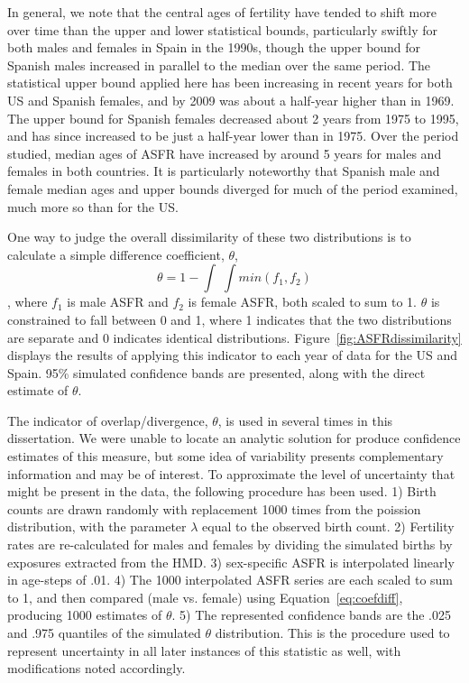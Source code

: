 In general, we note that the central ages of fertility have tended to shift more
over time than the upper and lower statistical bounds, particularly swiftly for
both males and females in Spain in the 1990s, though the upper bound for
Spanish males increased in parallel to the median over the same period. The
statistical upper bound applied here has been increasing in recent years for
both US and Spanish females, and by 2009 was about a half-year higher than in
1969. The upper bound for Spanish females decreased about 2 years from 1975
to 1995, and has since increased to be just a half-year lower than in 1975. Over
the period studied, median ages of ASFR have increased by around 5 years for
males and females in both countries. It is particularly noteworthy that Spanish
male and female median ages and upper bounds diverged for much of the period
examined, much more so than for the US.

One way to judge the overall dissimilarity of these two distributions is to
calculate a simple difference coefficient, $\theta$,
\begin{equation}
\label{eq:coefdiff}
\theta = 1 - \int \;\int min(f_1, f_2)
\end{equation}
, where $f_1$ is male ASFR and $f_2$ is female ASFR, both scaled to sum
to 1. $\theta$ is constrained to fall between 0 and 1, where 1 indicates that the
two distributions are separate and 0 indicates identical distributions.
Figure~\ref{fig:ASFRdissimilarity} displays the results of applying this
indicator to each year of data for the US and Spain. 95\% simulated confidence
bands are presented, along with the direct estimate of
$\theta$. 

The indicator of overlap/divergence, $\theta$, is
used in several times in this dissertation. We were unable to locate
an analytic solution for produce confidence estimates of this measure, but
some idea of variability presents complementary information and may be of
interest. To approximate the level of uncertainty that might be present in the
data, the following procedure has been used. 1) Birth counts are drawn randomly
with replacement 1000 times from the poission distribution, with the parameter
$\lambda$ equal to the observed birth count. 2) Fertility rates are
re-calculated for males and females by dividing the simulated births by
exposures extracted from the HMD. 3) sex-specific ASFR is interpolated linearly
in age-steps of .01. 4) The 1000 interpolated ASFR series are each scaled to sum
to 1, and then compared (male vs. female) using Equation~\ref{eq:coefdiff},
producing 1000 estimates of $\theta$. 5) The represented confidence bands are the .025 and .975 quantiles
of the simulated $\theta$ distribution. This is the procedure used to represent
uncertainty in all later instances of this statistic as well, with
modifications noted accordingly. 

